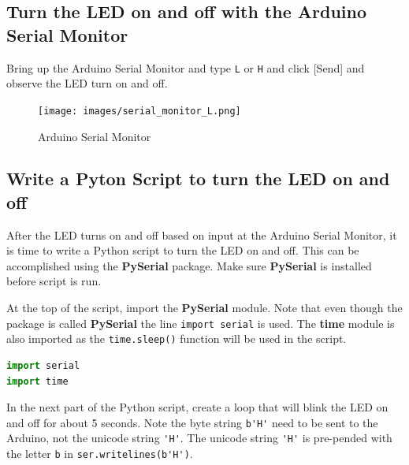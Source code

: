 \documentclass{book}
\begin{document}
    
        \subsection{Turn the LED on and off with the Arduino Serial
Monitor}\label{turn-the-led-on-and-off-with-the-arduino-serial-monitor}
    




    
        Bring up the Arduino Serial Monitor and type \lstinline!L! or
\lstinline!H! and click {[}Send{]} and observe the LED turn on and off.

\begin{figure}
\centering
\texttt{[image: images/serial\_monitor\_L.png]}
\caption{Arduino Serial Monitor}
\end{figure}
    




    
        \subsection{Write a Pyton Script to turn the LED on and
off}\label{write-a-pyton-script-to-turn-the-led-on-and-off}
    




    
        After the LED turns on and off based on input at the Arduino Serial
Monitor, it is time to write a Python script to turn the LED on and off.
This can be accomplished using the \textbf{PySerial} package. Make sure
\textbf{PySerial} is installed before script is run.

At the top of the script, import the \textbf{PySerial} module. Note that
even though the package is called \textbf{PySerial} the line
\lstinline!import serial! is used. The \textbf{time} module is also
imported as the \lstinline!time.sleep()! function will be used in the
script.
    




    
        \begin{lstlisting}[language=Python]
import serial
import time
\end{lstlisting}
    




    
        In the next part of the Python script, create a loop that will blink the
LED on and off for about 5 seconds. Note the byte string
\lstinline!b'H'! need to be sent to the Arduino, not the unicode string
\lstinline!'H'!. The unicode string \lstinline!'H'! is pre-pended with
the letter \lstinline!b! in \lstinline!ser.writelines(b'H')!.
    
\end{document}

